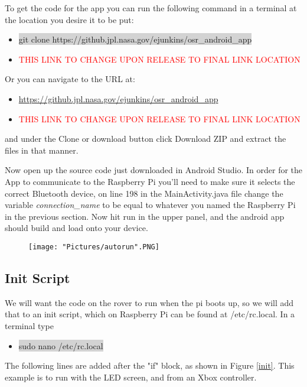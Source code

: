 \documentclass[12pt]{article}
\begin{document}
\bigskip

\noindent To get the code for the app you can run the following command in a terminal at the location you desire it to be put:

\begin{itemize}
	\item[] \colorbox{lightgray}{git clone https://github.jpl.nasa.gov/ejunkins/osr\_android\_app}
	\item[] \textcolor{red}{THIS LINK TO CHANGE UPON RELEASE TO FINAL LINK LOCATION}
\end{itemize}

\noindent Or you can navigate to the URL at:

\begin{itemize}
	\item[] \href{https://github.jpl.nasa.gov/ejunkins/osr_android_app}{https://github.jpl.nasa.gov/ejunkins/osr\_android\_app}
	\item[] \textcolor{red}{THIS LINK TO CHANGE UPON RELEASE TO FINAL LINK LOCATION}
\end{itemize}

\noindent and under the Clone or download button click Download ZIP and extract the files in that manner. 

\bigskip

\noindent Now open up the source code just downloaded in Android Studio. In order for the App to communicate to the Raspberry Pi you'll need to make sure it selects the correct Bluetooth device, on line 198 in the MainActivity.java file change the variable \textit{connection\_name} to be equal to whatever you named the Raspberry Pi in the previous section. Now hit run in the upper panel, and the android app should build and load onto your device. 

\begin{figure}[H]
 	\centering
	\texttt{[image: "Pictures/autorun".PNG]}
 	\caption{}
	\label{}
\end{figure}


\subsection{Init Script}
We will want the code on the rover to run when the pi boots up, so we will add that to an init script, which on Raspberry Pi can be found at /etc/rc.local. In a terminal type
\begin{itemize}
	\item[] \colorbox{lightgray}{sudo nano /etc/rc.local}
\end{itemize}
\noindent The following lines are added after the "if" block, as shown in Figure \ref{init}. This example is to run with the LED screen, and from an Xbox controller.
\end{document}
